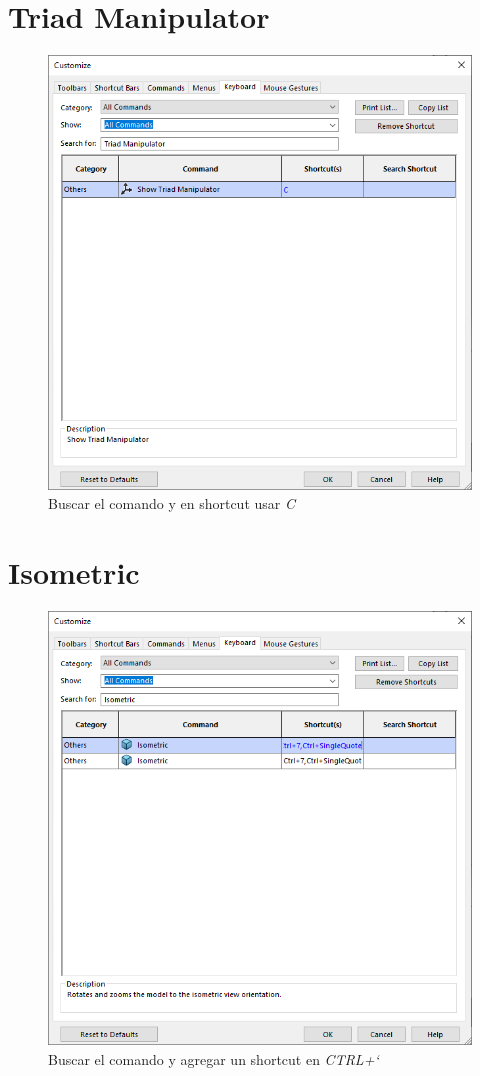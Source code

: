 \documentclass{report}
\begin{document}
\section{Triad Manipulator}

\begin{figure}[H]
	\centering
	\includegraphics[width=0.85\linewidth, height=0.65\textheight,keepaspectratio]{Imagenes/solidworks_keyboard_03}
	\caption{Buscar el comando y en shortcut usar \emph{C}}
	\label{fig:solidworkskeyboard03}
\end{figure}

\section{Isometric}

\begin{figure}[H]
	\centering
	\includegraphics[width=0.85\linewidth, height=0.65\textheight,keepaspectratio]{Imagenes/solidworks_keyboard_04}
	\caption{Buscar el comando y agregar un shortcut en \emph{CTRL+`}}
	\label{fig:solidworkskeyboard04}
\end{figure}
\end{document}
